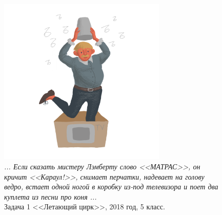 \documentclass[10pt]{scrbook} \usepackage{modules/nonstahp_book}
\begin{document}
\begin{figure} \begin{center}
	\includegraphics[width=8cm]{figures/color/09}
	\caption{
             {\itshape ... Если сказать мистеру Лэмберту слово <<МАТРАС>>, он кричит <<Караул!>>, 
              снимает перчатки, надевает на голову ведро, встает одной ногой в коробку 
              из-под телевизора и поет два куплета из песни про коня ...}\\
             {Задача 1 <<Летающий цирк>>, 2018 год, 5 класс.}}
\end{center} \end{figure}
\end{document}
